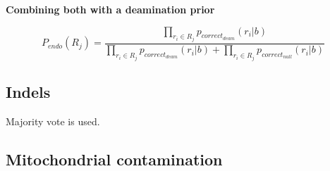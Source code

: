 \documentclass[a4paper,12pt]{article}
\begin{document}
%
%
%
%
%
%
%
%
%

{\bf Combining both with a deamination prior}


\begin{equation}
P_{endo}(R_j) = \frac { \prod\limits_{r_i \in R_j} p_{correct_{deam}}(r_i|b) } { \prod\limits_{r_i \in R_j} p_{correct_{deam}}(r_i|b) + \prod\limits_{r_i \in R_j} p_{correct_{null}}(r_i|b) }
\end{equation}



\subsection{Indels}


Majority vote is used.



\subsection{Mitochondrial contamination}
\end{document}
